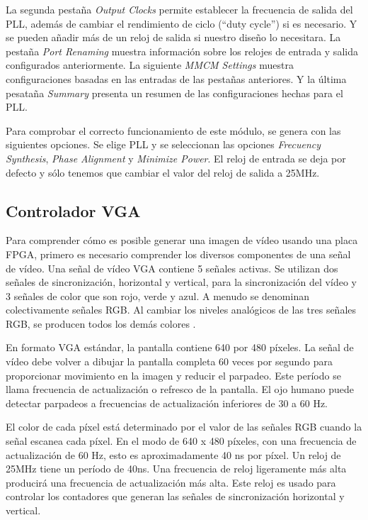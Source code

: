 La segunda pestaña \textit{Output Clocks} permite establecer la frecuencia de salida del PLL, además de cambiar el rendimiento de ciclo (``duty cycle'') si es necesario. Y se 
pueden añadir más de un reloj de salida si nuestro diseño lo necesitara. La pestaña \textit{Port Renaming} muestra información sobre los relojes 
de entrada y salida configurados anteriormente. La siguiente \textit{MMCM Settings} muestra configuraciones basadas en las entradas de las 
pestañas anteriores. Y la última pesataña \textit{Summary} presenta un resumen de las configuraciones hechas para el PLL.

Para comprobar el correcto funcionamiento de este módulo, se genera con las siguientes opciones. Se elige PLL y se seleccionan las opciones \textit{Frecuency Synthesis}, 
\textit{Phase Alignment} y \textit{Minimize Power}. El reloj de entrada se deja por defecto y sólo tenemos que cambiar el valor del reloj de salida a 25MHz.

\subsection{Controlador VGA}

Para comprender cómo es posible generar una imagen de vídeo usando una placa FPGA, primero es necesario comprender los diversos componentes de 
una señal de vídeo. Una señal de vídeo VGA contiene 5 señales activas. Se utilizan dos señales de sincronización, horizontal y vertical, para 
la sincronización del vídeo y 3 señales de color que son rojo, verde y azul. A menudo se denominan colectivamente señales RGB. Al cambiar los 
niveles analógicos de las tres señales RGB, se producen todos los demás colores \cite{hamblen2007rapid}.

En formato VGA estándar, la pantalla contiene 640 por 480 píxeles. La señal de vídeo debe volver a dibujar la pantalla completa 60 veces por 
segundo para proporcionar movimiento en la imagen y reducir el parpadeo. Este período se llama frecuencia de actualización o refresco de la pantalla. 
El ojo humano puede detectar parpadeos a frecuencias de actualización inferiores de 30 a 60 Hz. 

El color de cada píxel está determinado por el valor de las señales RGB cuando la señal escanea cada píxel. En el modo de 640 x 480 píxeles, con 
una frecuencia de actualización de 60 Hz, esto es aproximadamente 40 ns por píxel. Un reloj de 25MHz tiene un período de 40ns. Una frecuencia de reloj 
ligeramente más alta producirá una frecuencia de actualización más alta. Este reloj es usado para controlar los contadores que generan las señales de 
sincronización horizontal y vertical.

